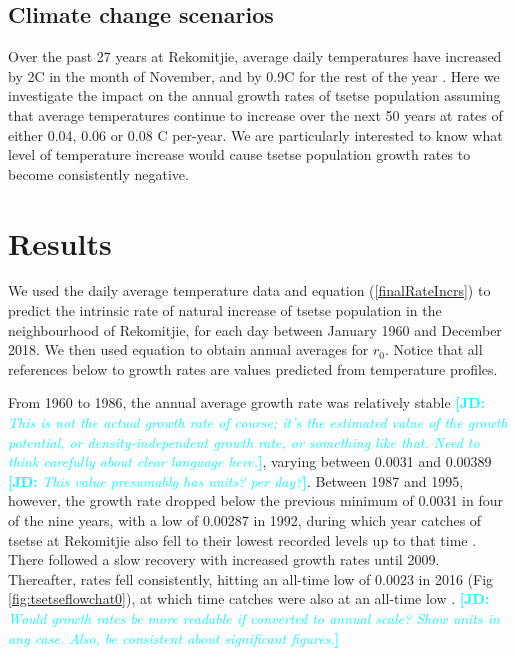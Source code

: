 \documentclass[12pt,a4paper]{article}
\newcommand{\comment}[3]{\textcolor{#1}{\textbf{[#2: }\textsl{#3}\textbf{]}}}
\newcommand{\jd}[1]{\comment{cyan}{JD}{#1}}
\begin{document}
\newpage
\subsection*{Climate change scenarios}

Over the past 27 years at Rekomitjie, average daily temperatures have increased by 2\textdegree C in the month of November, and by 0.9\textdegree C for the rest of the year \cite{Lord2018}.  Here we investigate the impact on the annual growth rates of tsetse population assuming that average temperatures continue to increase over the next 50 years at rates of either 0.04, 0.06 or 0.08 \textdegree C per-year. We are particularly interested to know what level of temperature increase would cause tsetse population growth rates to become consistently negative.

\section*{Results}
We used the daily average temperature data and equation (\ref{finalRateIncrs}) to predict the intrinsic rate of natural increase of tsetse population in the neighbourhood of Rekomitjie, for each day between January 1960 and December 2018. We then used equation to obtain annual averages for $r_0$. Notice that all references below to growth rates are values predicted from temperature profiles.   

From 1960 to 1986, the annual average growth rate was relatively stable \jd{This is not the actual growth rate of course; it's the estimated value of the growth potential, or density-independent growth rate, or something like that. Need to think carefully about clear language here.}, varying between 0.0031 and 0.00389 \jd{This value presumably has units? per day?}.  Between 1987 and 1995, however, the growth rate dropped below the previous minimum of 0.0031 in four of the nine years, with a low of 0.00287 in 1992, during which year catches of tsetse at Rekomitjie also fell to their lowest recorded levels up to that time \cite{hargrove2015mortality}. There followed a slow recovery with increased growth rates until 2009. Thereafter, rates fell consistently, hitting an all-time low of 0.0023 in 2016 (Fig \ref{fig:tsetseflowchat0}), at which time catches were also at an all-time low \cite{Lord2018}. \jd{Would growth rates be more readable if converted to annual scale? \emph{Show} units in any case. Also, be consistent about significant figures.}
\end{document}
